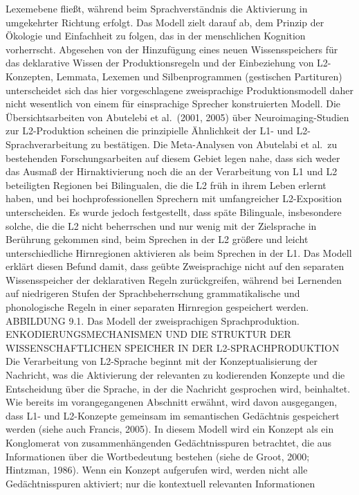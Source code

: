 \documentclass[
  letterpaper,
]{scrbook}
\begin{document}
Lexemebene fließt, während beim Sprachverständnis die Aktivierung in
umgekehrter Richtung erfolgt. Das Modell zielt darauf ab, dem Prinzip
der Ökologie und Einfachheit zu folgen, das in der menschlichen
Kognition vorherrscht. Abgesehen von der Hinzufügung eines neuen
Wissensspeichers für das deklarative Wissen der Produktionsregeln und
der Einbeziehung von L2-Konzepten, Lemmata, Lexemen und Silbenprogrammen
(gestischen Partituren) unterscheidet sich das hier vorgeschlagene
zweisprachige Produktionsmodell daher nicht wesentlich von einem für
einsprachige Sprecher konstruierten Modell. Die Übersichtsarbeiten von
Abutelebi et al.~(2001, 2005) über Neuroimaging-Studien zur
L2-Produktion scheinen die prinzipielle Ähnlichkeit der L1- und
L2-Sprachverarbeitung zu bestätigen. Die Meta-Analysen von Abutelabi et
al.~zu bestehenden Forschungsarbeiten auf diesem Gebiet legen nahe, dass
sich weder das Ausmaß der Hirnaktivierung noch die an der Verarbeitung
von L1 und L2 beteiligten Regionen bei Bilingualen, die die L2 früh in
ihrem Leben erlernt haben, und bei hochprofessionellen Sprechern mit
umfangreicher L2-Exposition unterscheiden. Es wurde jedoch festgestellt,
dass späte Bilinguale, insbesondere solche, die die L2 nicht beherrschen
und nur wenig mit der Zielsprache in Berührung gekommen sind, beim
Sprechen in der L2 größere und leicht unterschiedliche Hirnregionen
aktivieren als beim Sprechen in der L1. Das Modell erklärt diesen Befund
damit, dass geübte Zweisprachige nicht auf den separaten Wissensspeicher
der deklarativen Regeln zurückgreifen, während bei Lernenden auf
niedrigeren Stufen der Sprachbeherrschung grammatikalische und
phonologische Regeln in einer separaten Hirnregion gespeichert werden.
ABBILDUNG 9.1. Das Modell der zweisprachigen Sprachproduktion.
ENKODIERUNGSMECHANISMEN UND DIE STRUKTUR DER WISSENSCHAFTLICHEN SPEICHER
IN DER L2-SPRACHPRODUKTION Die Verarbeitung von L2-Sprache beginnt mit
der Konzeptualisierung der Nachricht, was die Aktivierung der relevanten
zu kodierenden Konzepte und die Entscheidung über die Sprache, in der
die Nachricht gesprochen wird, beinhaltet. Wie bereits im
vorangegangenen Abschnitt erwähnt, wird davon ausgegangen, dass L1- und
L2-Konzepte gemeinsam im semantischen Gedächtnis gespeichert werden
(siehe auch Francis, 2005). In diesem Modell wird ein Konzept als ein
Konglomerat von zusammenhängenden Gedächtnisspuren betrachtet, die aus
Informationen über die Wortbedeutung bestehen (siehe de Groot, 2000;
Hintzman, 1986). Wenn ein Konzept aufgerufen wird, werden nicht alle
Gedächtnisspuren aktiviert; nur die kontextuell relevanten Informationen
\end{document}
